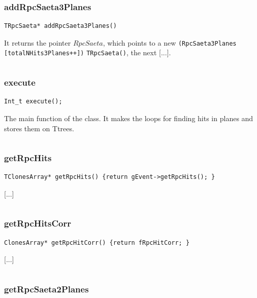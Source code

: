 \documentclass[a4paper]{book}
\begin{document}
\[\]

\subsubsection{addRpcSaeta3Planes}

\begin{lstlisting}[style=customc]
TRpcSaeta* addRpcSaeta3Planes()
\end{lstlisting}

It returns the pointer $RpcSaeta$, which points to a new \texttt{(RpcSaeta3Planes} \texttt{[totalNHits3Planes++])} \texttt{TRpcSaeta()}, the next [...].

\[\]

\subsubsection{execute}

\begin{lstlisting}[style=customc]
Int_t execute();
\end{lstlisting}

The main function of the class. It makes the loops for finding hits in planes and stores them on Ttrees.

\[\]

\subsubsection{getRpcHits}

\begin{lstlisting}[style=customc]
TClonesArray* getRpcHits() {return gEvent->getRpcHits(); }
\end{lstlisting}

[...]

\[\]

\subsubsection{getRpcHitsCorr}

\begin{lstlisting}[style=customc]
ClonesArray* getRpcHitCorr() {return fRpcHitCorr; }
\end{lstlisting}

[...]

\[\]

\subsubsection{getRpcSaeta2Planes}
\end{document}
